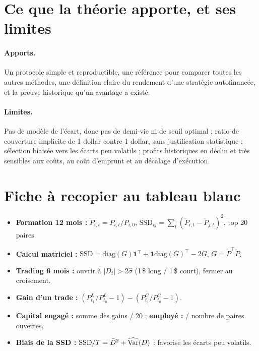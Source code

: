 \section{Ce que la théorie apporte, et ses limites}

\paragraph{Apports.} Un protocole simple et reproductible, une référence pour comparer toutes les autres méthodes, une définition claire du rendement d'une stratégie autofinancée, et la preuve historique qu'un avantage a existé.

\paragraph{Limites.} Pas de modèle de l'écart, donc pas de demi-vie ni de seuil optimal ; ratio de couverture implicite de 1 dollar contre 1 dollar, sans justification statistique ; sélection biaisée vers les écarts peu volatils ; profits historiques en déclin et très sensibles aux coûts, au coût d'emprunt et au décalage d'exécution.

\section{Fiche à recopier au tableau blanc}

\begin{whiteboard}
\begin{itemize}[leftmargin=1.2em]
\item \textbf{Formation 12 mois :} $\tilde P_{i,t} = P_{i,t}/P_{i,0}$, $\mathrm{SSD}_{ij} = \sum_t(\tilde P_{i,t}-\tilde P_{j,t})^2$, top 20 paires.
\item \textbf{Calcul matriciel :} $\mathrm{SSD} = \mathrm{diag}(G)\mathbf 1^\top + \mathbf 1\mathrm{diag}(G)^\top - 2G$, $G = \tilde P^\top\tilde P$.
\item \textbf{Trading 6 mois :} ouvrir à $|D_t| > 2\hat\sigma$ (1\,\$ long / 1\,\$ court), fermer au croisement.
\item \textbf{Gain d'un trade :} $(P^L_{t_1}/P^L_{t_0}-1) - (P^C_{t_1}/P^C_{t_0}-1)$.
\item \textbf{Capital engagé :} somme des gains / 20 ; \textbf{employé :} / nombre de paires ouvertes.
\item \textbf{Biais de la SSD :} $\mathrm{SSD}/T = \bar D^2 + \widehat{\operatorname{Var}}(D)$ : favorise les écarts peu volatils.
\end{itemize}
\end{whiteboard}

